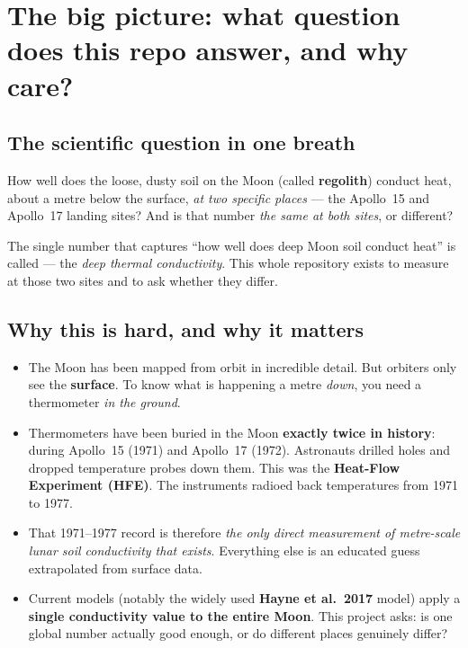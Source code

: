 \section{The big picture: what question does this repo answer, and why care?}
\label{sec:bigpicture}

\subsection{The scientific question in one breath}
\label{sec:question}

How well does the loose, dusty soil on the Moon (called \textbf{regolith})
conduct heat, about a metre below the surface, \emph{at two specific places} ---
the Apollo~15 and Apollo~17 landing sites? And is that number \emph{the same at
both sites}, or different?

The single number that captures ``how well does deep Moon soil conduct heat'' is
called \Kd{} --- the \emph{deep thermal conductivity}. This whole repository
exists to measure \Kd{} at those two sites and to ask whether they differ.

\subsection{Why this is hard, and why it matters}

\begin{itemize}[leftmargin=1.4em,itemsep=3pt]
  \item The Moon has been mapped from orbit in incredible detail. But orbiters
    only see the \textbf{surface}. To know what is happening a metre \emph{down},
    you need a thermometer \emph{in the ground}.
  \item Thermometers have been buried in the Moon \textbf{exactly twice in
    history}: during Apollo~15 (1971) and Apollo~17 (1972). Astronauts drilled
    holes and dropped temperature probes down them. This was the
    \textbf{Heat-Flow Experiment (HFE)}. The instruments radioed back
    temperatures from 1971 to 1977.
  \item That 1971--1977 record is therefore \emph{the only direct measurement of
    metre-scale lunar soil conductivity that exists}. Everything else is an
    educated guess extrapolated from surface data.
  \item Current models (notably the widely used \textbf{Hayne et al.\ 2017}
    model) apply a \textbf{single conductivity value to the entire Moon}. This
    project asks: is one global number actually good enough, or do different
    places genuinely differ?
\end{itemize}

